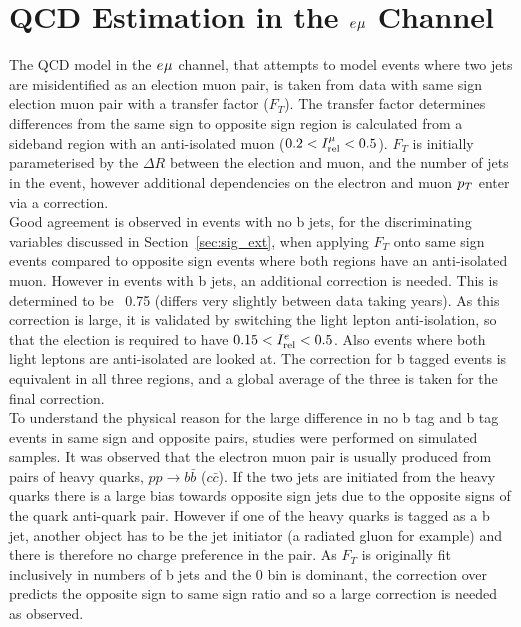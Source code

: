 \newpage
\section{QCD Estimation in the $e_{}\mu_{}$ Channel}
\label{sec:qcd}

The QCD model in the $e_{}\mu_{}$ channel, that attempts to model events where two jets are misidentified as an election muon pair, is taken from data with same sign election muon pair with a transfer factor ($F_{T}$).
The transfer factor determines differences from the same sign to opposite sign region is calculated from a sideband region with an anti-isolated muon ($0.2 < I_{\text{rel}}^{\mu} < 0.5$).
$F_{T}$ is initially parameterised by the $\Delta R$ between the election and muon, and the number of jets in the event, however additional dependencies on the electron and muon $p_{T}$ enter via a correction. \\
Good agreement is observed in events with no b jets, for the discriminating variables discussed in Section~\ref{sec:sig_ext}, when applying $F_{T}$ onto same sign events compared to opposite sign events where both regions have an anti-isolated muon. 
However in events with b jets, an additional correction is needed.
This is determined to be ~0.75 (differs very slightly between data taking years).
As this correction is large, it is validated by switching the light lepton anti-isolation, so that the election is required to have $0.15 < I_{\text{rel}}^{e} < 0.5$.
Also events where both light leptons are anti-isolated are looked at.
The correction for b tagged events is equivalent in all three regions, and a global average of the three is taken for the final correction. \\

To understand the physical reason for the large difference in no b tag and b tag events in same sign and opposite pairs, studies were performed on simulated samples.
It was observed that the electron muon pair is usually produced from pairs of heavy quarks, $pp\rightarrow b\bar{b}$ ($c\bar{c}$).
If the two jets are initiated from the heavy quarks there is a large bias towards opposite sign jets due to the opposite signs of the quark anti-quark pair.
However if one of the heavy quarks is tagged as a b jet, another object has to be the jet initiator (a radiated gluon for example) and there is therefore no charge preference in the pair.
As $F_{T}$ is originally fit inclusively in numbers of b jets and the 0 bin is dominant, the correction over predicts the opposite sign to same sign ratio and so a large correction is needed as observed.

